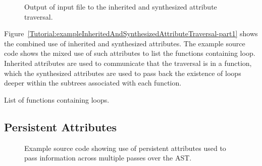 \begin{figure}[!h]
{\indent
{\mySmallFontSize

\begin{latexonly}
   
\end{latexonly}

\begin{htmlonly}
   
\end{htmlonly}

}
}
\caption{Output of input file to the inherited and synthesized attribute traversal.}
\label{Tutorial:exampleOutput_InheritedAndSynthesizedAttributeTraversal}
\end{figure}

   Figure~\ref{Tutorial:exampleInheritedAndSynthesizedAttributeTraversal-part1}
shows the combined use of inherited and synthesized attributes.  The example
source code shows the mixed use of such attributes to list the functions 
containing loop.  Inherited attributes are used to communicate that 
the traversal is in a function, which the synthesized attributes are
used to pass back the existence of loops deeper within the subtrees
associated with each function.

    List of functions containing loops.







\clearpage
\subsection{Persistent Attributes}

\begin{figure}[!h]
{\indent
{\mySmallFontSize


\begin{latexonly}
   
\end{latexonly}

\begin{htmlonly}
   
\end{htmlonly}

}
}
\caption{Example source code showing use of persistent attributes used to pass information
         across multiple passes over the AST.}
\label{Tutorial:examplePersistentAttributes}
\end{figure}


